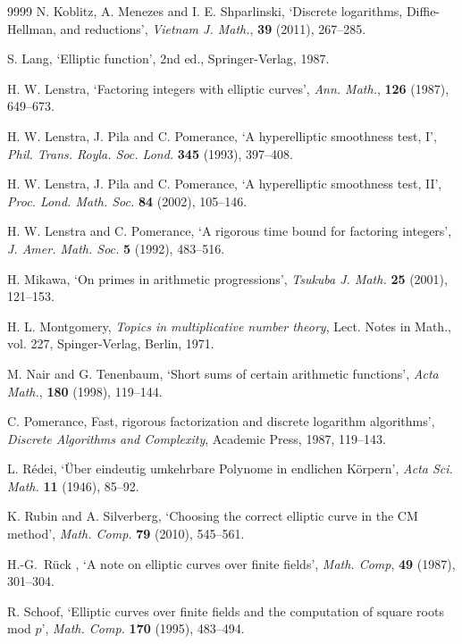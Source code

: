\documentclass[12pt]{amsart}
\begin{document}
\begin{thebibliography}{9999}
  N. Koblitz, A. Menezes and I. E. Shparlinski, 
`Discrete logarithms, Diffie-Hellman, and reductions',  
{\it Vietnam J. Math.\/}, {\bf 39} (2011), 267--285.

 S. Lang, `Elliptic function', 2nd ed., Springer-Verlag, 1987.

 H. W. Lenstra, `Factoring integers with elliptic curves',
{\it Ann. Math.\/}, {\bf 126} (1987), 649--673.

H. W. Lenstra, J. Pila and C. Pomerance, `A hyperelliptic smoothness
test, I',  
{\it Phil. Trans. Royla. Soc. Lond.\/}   {\bf 345} (1993),  397--408.

H. W. Lenstra,   J. Pila and C. Pomerance, `A hyperelliptic smoothness
test, II',  
{\it Proc. Lond. Math. Soc.\/}   {\bf 84} (2002), 105--146. 

H. W. Lenstra and C. Pomerance, `A rigorous time bound for factoring
integers',  
{\it J. Amer. Math. Soc.\/} {\bf 5} (1992),  483--516.

H. Mikawa, `On primes in arithmetic progressions', {\it Tsukuba
J. Math.\/} {\bf 25} (2001), 121--153.

 H. L. Montgomery, {\it Topics in multiplicative number theory\/}, 
Lect. Notes in Math., vol. 227, Spinger-Verlag, Berlin, 1971.


 M. Nair and G. Tenenbaum, `Short sums of certain arithmetic functions',  
{\it Acta Math.\/}, {\bf 180} (1998), 119--144. 

C. Pomerance, Fast, rigorous factorization and discrete logarithm algorithms',  
{\it Discrete Algorithms and Complexity\/}, Academic Press, 1987, 119--143.

 L. R{\'e}dei, `\"Uber eindeutig umkehrbare Polynome in endlichen K\"orpern',  
{\it Acta Sci. Math.\/} {\bf 11} (1946), 85--92.

 K. Rubin and A. Silverberg, `Choosing the correct elliptic curve in the CM method', {\it Math. Comp.} {\bf 79} (2010), 545--561.

 H.-G.~R\"uck ,
`A note on elliptic curves over finite fields',
{\it Math. Comp\/},  {\bf 49}  (1987), 301--304.

 R. Schoof, `Elliptic curves over finite fields 
and the computation of square roots mod $p$', 
{\it Math. Comp.\/} {\bf 170} (1995), 483--494.


\end{thebibliography}
\end{document}
